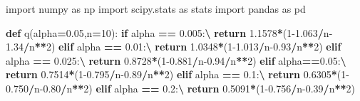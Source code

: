 \documentclass[polish,]{book}
\newenvironment{Shaded}{\begin{snugshade}}{\end{snugshade}}
\newcommand{\ControlFlowTok}[1]{\textcolor[rgb]{0.13,0.29,0.53}{\textbf{#1}}}
\newcommand{\DecValTok}[1]{\textcolor[rgb]{0.00,0.00,0.81}{#1}}
\newcommand{\FloatTok}[1]{\textcolor[rgb]{0.00,0.00,0.81}{#1}}
\newcommand{\ImportTok}[1]{#1}
\newcommand{\KeywordTok}[1]{\textcolor[rgb]{0.13,0.29,0.53}{\textbf{#1}}}
\newcommand{\NormalTok}[1]{#1}
\newcommand{\OperatorTok}[1]{\textcolor[rgb]{0.81,0.36,0.00}{\textbf{#1}}}
\begin{document}
\begin{Shaded}
\begin{Highlighting}[]
\ImportTok{import}\NormalTok{ numpy }\ImportTok{as}\NormalTok{ np}
\ImportTok{import}\NormalTok{ scipy.stats }\ImportTok{as}\NormalTok{ stats}
\ImportTok{import}\NormalTok{ pandas }\ImportTok{as}\NormalTok{ pd}

\KeywordTok{def}\NormalTok{ q(alpha}\OperatorTok{=}\FloatTok{0.05}\NormalTok{,n}\OperatorTok{=}\DecValTok{10}\NormalTok{):}
    \ControlFlowTok{if}\NormalTok{ alpha }\OperatorTok{==} \FloatTok{0.005}\NormalTok{:}\OperatorTok{\textbackslash{}}
    \ControlFlowTok{return} \FloatTok{1.1578}\OperatorTok{*}\NormalTok{(}\DecValTok{1}\FloatTok{-1.063}\OperatorTok{/}\NormalTok{n}\FloatTok{-1.34}\OperatorTok{/}\NormalTok{n}\OperatorTok{**}\DecValTok{2}\NormalTok{)}
    \ControlFlowTok{elif}\NormalTok{ alpha }\OperatorTok{==} \FloatTok{0.01}\NormalTok{:}\OperatorTok{\textbackslash{}}
    \ControlFlowTok{return} \FloatTok{1.0348}\OperatorTok{*}\NormalTok{(}\DecValTok{1}\FloatTok{-1.013}\OperatorTok{/}\NormalTok{n}\FloatTok{-0.93}\OperatorTok{/}\NormalTok{n}\OperatorTok{**}\DecValTok{2}\NormalTok{)}
    \ControlFlowTok{elif}\NormalTok{ alpha }\OperatorTok{==} \FloatTok{0.025}\NormalTok{:}\OperatorTok{\textbackslash{}}
    \ControlFlowTok{return} \FloatTok{0.8728}\OperatorTok{*}\NormalTok{(}\DecValTok{1}\FloatTok{-0.881}\OperatorTok{/}\NormalTok{n}\FloatTok{-0.94}\OperatorTok{/}\NormalTok{n}\OperatorTok{**}\DecValTok{2}\NormalTok{)}
    \ControlFlowTok{elif}\NormalTok{ alpha}\OperatorTok{==}\FloatTok{0.05}\NormalTok{:}\OperatorTok{\textbackslash{}}
    \ControlFlowTok{return} \FloatTok{0.7514}\OperatorTok{*}\NormalTok{(}\DecValTok{1}\FloatTok{-0.795}\OperatorTok{/}\NormalTok{n}\FloatTok{-0.89}\OperatorTok{/}\NormalTok{n}\OperatorTok{**}\DecValTok{2}\NormalTok{)}
    \ControlFlowTok{elif}\NormalTok{ alpha }\OperatorTok{==} \FloatTok{0.1}\NormalTok{:}\OperatorTok{\textbackslash{}}
    \ControlFlowTok{return} \FloatTok{0.6305}\OperatorTok{*}\NormalTok{(}\DecValTok{1}\FloatTok{-0.750}\OperatorTok{/}\NormalTok{n}\FloatTok{-0.80}\OperatorTok{/}\NormalTok{n}\OperatorTok{**}\DecValTok{2}\NormalTok{)}
    \ControlFlowTok{elif}\NormalTok{ alpha }\OperatorTok{==} \FloatTok{0.2}\NormalTok{:}\OperatorTok{\textbackslash{}}
    \ControlFlowTok{return} \FloatTok{0.5091}\OperatorTok{*}\NormalTok{(}\DecValTok{1}\FloatTok{-0.756}\OperatorTok{/}\NormalTok{n}\FloatTok{-0.39}\OperatorTok{/}\NormalTok{n}\OperatorTok{**}\DecValTok{2}\NormalTok{)}


\end{Highlighting}
\end{Shaded}
\end{document}
